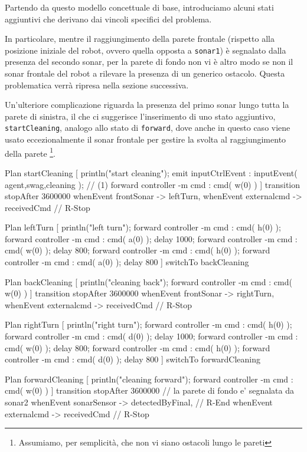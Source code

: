 \documentclass{../llncs}
\newcommand{\code}[1]{{\color{blue}\small{\texttt{#1}}}}
\begin{document}
Partendo da questo modello concettuale di base, introduciamo alcuni stati aggiuntivi che derivano dai vincoli specifici del problema.

In particolare, mentre il raggiungimento della parete frontale (rispetto alla posizione iniziale del robot, ovvero quella opposta a \code{sonar1}) è segnalato dalla presenza del secondo sonar, per la parete di fondo non vi è altro modo se non il sonar frontale del robot a rilevare la presenza di un generico ostacolo. Questa problematica verrà ripresa nella sezione successiva.

Un'ulteriore complicazione riguarda la presenza del primo sonar lungo tutta la parete di sinistra, il che ci suggerisce l'inserimento di uno stato aggiuntivo, \texttt{startCleaning}, analogo allo stato di \texttt{forward}, dove anche in questo caso viene usato eccezionalmente il sonar frontale per gestire la svolta al raggiungimento della parete
\footnote{Assumiamo, per semplicità, che non vi siano ostacoli lungo le pareti}.

\begin{qacode}[caption={SoftwareAgent, pt5}]
Plan startCleaning [
	println("start cleaning");
	emit inputCtrlEvent : inputEvent( agent,swag,cleaning ); // (1)
	forward controller -m cmd : cmd( w(0) )
]
transition stopAfter 3600000
	whenEvent frontSonar -> leftTurn,
	whenEvent externalcmd -> receivedCmd // R-Stop
	
Plan leftTurn [
	println("left turn");	
	forward controller -m cmd : cmd( h(0) );
	forward controller -m cmd : cmd( a(0) );
	delay 1000;
	forward controller -m cmd : cmd( w(0) );
	delay 800;
	forward controller -m cmd : cmd( h(0) );
	forward controller -m cmd : cmd( a(0) );
	delay 800
]
switchTo backCleaning

Plan backCleaning [
	println("cleaning back");
	forward controller -m cmd : cmd( w(0) )
]
transition stopAfter 3600000
	whenEvent frontSonar -> rightTurn,
	whenEvent externalcmd -> receivedCmd // R-Stop
	
Plan rightTurn [
	println("right turn");
	forward controller -m cmd : cmd( h(0) );
	forward controller -m cmd : cmd( d(0) );
	delay 1000;
	forward controller -m cmd : cmd( w(0) );
	delay 800;
	forward controller -m cmd : cmd( h(0) );
	forward controller -m cmd : cmd( d(0) );
	delay 800
]
switchTo forwardCleaning

Plan forwardCleaning [
	println("cleaning forward");
	forward controller -m cmd : cmd( w(0) )
]
transition stopAfter 3600000
	// la parete di fondo e' segnalata da sonar2
	whenEvent sonarSensor -> detectedByFinal, // R-End
	whenEvent externalcmd -> receivedCmd // R-Stop
\end{qacode}
\end{document}
